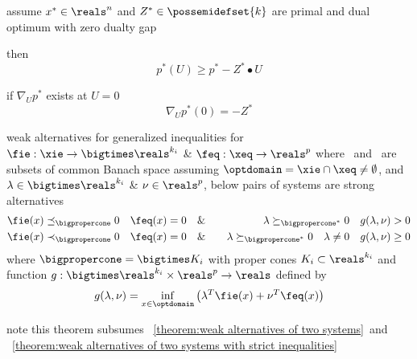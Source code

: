 \documentclass[17pt,landscape]{foils}
\begin{document}
{\vitem
	assume $x^\ast\in\reals^n$ and $Z^\ast\in\possemidefset{k}$
	are primal and dual optimum with zero dualty gap

\vitem
	then
	$$
		p^\ast(U) \geq p^\ast - Z^\ast \bullet U
	$$

\vitem
	if $\nabla_U p^\ast$ exists at $U=0$
	$$
		\nabla_U p^\ast(0) = - Z^\ast
	$$
\eit
\vfill



\begin{mytheorem}{weak alternatives for generalized inequalities}
	for $\fie:\xie \to \bigtimes \reals^{k_i}$ \& $\feq:\xeq \to \reals^p$
	where \xie\ and \xeq\ are subsets of common Banach space
	assuming $\optdomain = \xie \cap \xeq \neq \emptyset$,
	and $\lambda \in \bigtimes \reals^{k_i}$ \& $\nu \in \reals^p$,
	below pairs of systems are strong alternatives
		\begin{eqnarray*}
			\fie(x) \preceq_\bigpropercone 0
			\quad
			\feq(x) = 0
			\quad
			&
			\&
			&
			\quad
			\lambda\succeq_{\bigpropercone^\ast} 0
			\quad
			g(\lambda,\nu) > 0
			\\
			\fie(x) \prec_\bigpropercone 0
			\quad
			\feq(x) = 0
			\quad
			&
			\&
			&
			\quad
			\lambda\succeq_{\bigpropercone^\ast} 0
			\quad
			\lambda \neq 0
			\quad
			g(\lambda,\nu) \geq 0
		\end{eqnarray*}
	where $\bigpropercone = \bigtimes K_i$ with proper cones $K_i\subset\reals^{k_i}$
	and function $g:\bigtimes \reals^{k_i} \times \reals^p \to \reals$ defined by
		$$
			g(\lambda,\nu) = \inf_{x\in\optdomain} \left( \lambda^T \fie(x) + \nu^T \feq(x) \right)
		$$

		note this theorem subsumes
		\theoremname~\ref{theorem:weak alternatives of two systems}\
		and
		\theoremname~\ref{theorem:weak alternatives of two systems with strict inequalities}\
\end{mytheorem}



}
\end{document}
